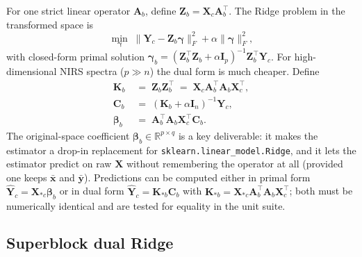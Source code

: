 \documentclass[11pt,a4paper]{article}
\newcommand{\R}{\mathbb{R}}
\newcommand{\identity}{\mathbf{I}}
\newcommand{\Xmat}{\mathbf{X}}
\newcommand{\Ymat}{\mathbf{Y}}
\newcommand{\Yc}{\mathbf{Y}_{\!c}}
\newcommand{\Amat}{\mathbf{A}}
\newcommand{\Zmat}{\mathbf{Z}}
\newcommand{\Kmat}{\mathbf{K}}
\newcommand{\Cmat}{\mathbf{C}}
\newcommand{\xvec}{\mathbf{x}}
\newcommand{\yvec}{\mathbf{y}}
\begin{document}
For one strict linear operator $\Amat_b$, define
$\Zmat_b=\Xmat_c\Amat_b^\top$. The Ridge problem in the transformed
space is
\begin{equation}
\min_{\bm\gamma}\;\|\Yc-\Zmat_b\bm\gamma\|_F^2 + \alpha\|\bm\gamma\|_F^2,
\end{equation}
with closed-form primal solution
$\bm\gamma_b=(\Zmat_b^\top\Zmat_b+\alpha\identity_p)^{-1}\Zmat_b^\top\Yc$.
For high-dimensional NIRS spectra ($p\gg n$) the dual form is much
cheaper. Define
\begin{align}
\Kmat_b &\;=\; \Zmat_b\Zmat_b^\top
            \;=\; \Xmat_c\Amat_b^\top\Amat_b\Xmat_c^\top, \\
\Cmat_b &\;=\; (\Kmat_b+\alpha\identity_n)^{-1}\Yc, \\
\bm\beta_b &\;=\; \Amat_b^\top\Amat_b\Xmat_c^\top\Cmat_b.
\label{eq:single-beta}
\end{align}
The original-space coefficient $\bm\beta_b\in\R^{p\times q}$ is a key
deliverable: it makes the estimator a drop-in replacement for
\texttt{sklearn.linear\_model.Ridge}, and it lets the estimator predict
on raw $\Xmat$ without remembering the operator at all (provided one
keeps $\bar{\xvec}$ and $\bar{\yvec}$). Predictions can be computed
either in primal form $\hat{\Ymat}_c=\Xmat_{*c}\bm\beta_b$ or in dual
form $\hat{\Ymat}_c=\Kmat_{*b}\Cmat_b$ with
$\Kmat_{*b}=\Xmat_{*c}\Amat_b^\top\Amat_b\Xmat_c^\top$; both must be
numerically identical and are tested for equality in the unit suite.

\subsection{Superblock dual Ridge}\label{sec:method-superblock}
\end{document}
